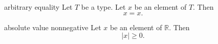 \begin{cleanresult}{arbitrary equality}
Let $T$ be a type.
Let $x$ be an element of $T$.
Then \[x=x.\]
\end{cleanresult}

\begin{cleanresult}{absolute value nonnegative}
Let $x$ be an element of $\mathbb{R}$.
Then \[\lvert x\rvert\ge 0.\]
\end{cleanresult}

